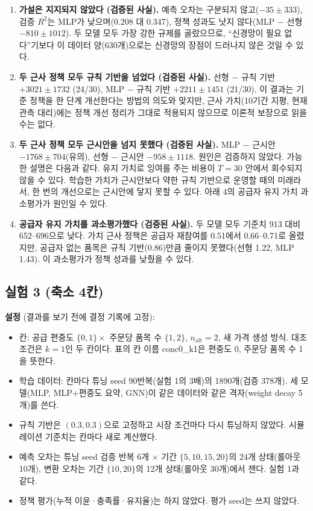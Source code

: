 \documentclass[11pt,a4paper]{article}
\begin{document}
\begin{enumerate}[leftmargin=1.5em]
  \item \textbf{가설은 지지되지 않았다 (검증된 사실).} 예측 오차는 구분되지 않고($-35\pm333$),
        검증 $R^2$는 MLP가 낮으며(0.208 대 0.347), 정책 성과도 낫지 않다(MLP $-$ 선형 $-810\pm1012$).
        두 모델 모두 가장 강한 규제를 골랐으므로, ``신경망이 필요 없다''기보다
        이 데이터 양(630개)으로는 신경망의 장점이 드러나지 않은 것일 수 있다.
  \item \textbf{두 근사 정책 모두 규칙 기반을 넘었다 (검증된 사실).} 선형 $-$ 규칙 기반 $+3021\pm1732$ (24/30),
        MLP $-$ 규칙 기반 $+2211\pm1451$ (21/30). 이 결과는 기준 정책을 한 단계 개선한다는 방법의 의도와 맞지만,
        근사 가치(10기간 지평, 현재 관측 대리)에는 정책 개선 정리가 그대로 적용되지 않으므로 이론적 보장으로 읽을 수는 없다.
  \item \textbf{두 근사 정책 모두 근시안을 넘지 못했다 (검증된 사실).} MLP $-$ 근시안 $-1768\pm704$(유의),
        선형 $-$ 근시안 $-958\pm1118$. 원인은 검증하지 않았다. 가능한 설명은 다음과 같다.
        유지 가치로 잉여를 주는 비용이 $T=30$ 안에서 회수되지 않을 수 있다.
        학습한 가치가 근시안보다 약한 규칙 기반으로 운영할 때의 미래라서, 한 번의 개선으로는 근시안에 닿지 못할 수 있다.
        아래 4의 공급자 유지 가치 과소평가가 원인일 수 있다.
  \item \textbf{공급자 유지 가치를 과소평가했다 (검증된 사실).} 두 모델 모두 기준치 913 대비 652--696으로 낮다.
        가치 근사 정책은 공급자 재참여를 0.51에서 0.66--0.71로 올렸지만, 공급자 없는 품목은 규칙 기반(0.86)만큼
        줄이지 못했다(선형 1.22, MLP 1.43). 이 과소평가가 정책 성과를 낮췄을 수 있다.
\end{enumerate}

\subsection{실험 3 (축소 4칸)}\label{sec:exp3}

\textbf{설정} (결과를 보기 전에 결정 기록에 고정):
\begin{itemize}[leftmargin=1.5em]
  \item 칸: 공급 편중도 $\{0,1\}\times$ 주문당 품목 수 $\{1,2\}$, $n_{\mathrm{alt}}=2$, 새 가격 생성 방식. 대조 조건은 $k=1$인 두 칸이다.
        표의 칸 이름 conc0\_k1은 편중도 0, 주문당 품목 수 1을 뜻한다.
  \item 학습 데이터: 칸마다 튜닝 seed 90반복(실험 1의 3배)의 1890개(검증 378개). 세 모델(MLP, MLP+편중도 요약, GNN)이 같은 데이터와 같은 격자(weight decay 5개)를 쓴다.
  \item 규칙 기반은 $(0.3,0.3)$으로 고정하고 시장 조건마다 다시 튜닝하지 않았다. 시뮬레이션 기준치는 칸마다 새로 계산했다.
  \item 예측 오차는 튜닝 seed 검증 반복 6개 $\times$ 기간 $\{5,10,15,20\}$의 24개 상태(롤아웃 10개), 변환 오차는 기간 $\{10,20\}$의 12개 상태(롤아웃 30개)에서 잰다. 실험 1과 같다.
  \item 정책 평가(누적 이윤·충족률·유지율)는 하지 않았다. 평가 seed는 쓰지 않았다.
\end{itemize}
\end{document}
